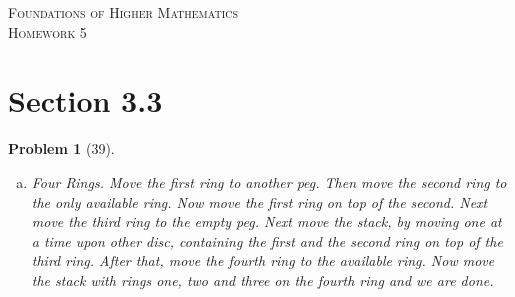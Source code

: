\documentclass{article}
\theoremstyle{problem}
\newtheorem{prob}{Problem}
\theoremstyle{plain}
\theoremstyle{remark}
\begin{document}
\begin{center}
\textsc{\Large Foundations of Higher Mathematics}\\[.3cm]
\textsc{\Large Homework 5}
\end{center}

\section*{Section 3.3}
\begin{prob}[39]\ \\[-1cm]
  \begin{enumerate}[a)]
    \item \textit{Four Rings.} Move the first ring to another peg. Then move the second ring to the only available ring. Now move the first ring on top of the second. Next move the third ring to the empty peg. Next move the stack, by moving one at a time upon other disc, containing the first and the second ring on top of the third ring. After that, move the fourth ring to the available ring. Now move the stack with rings one, two and three on the fourth ring and we are done.

\end{enumerate}
\end{prob}
\end{document}
